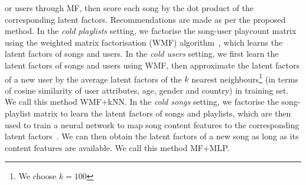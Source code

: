 \begin{itemize}
      or users through MF, then score each song by the dot product of the corresponding latent factors.
      Recommendations are made as per the proposed method.
      In the \emph{cold playlists} setting, we factorise the song-user playcount matrix using the 
      weighted matrix factorisation (WMF) algorithm~\cite{hu2008collaborative}, which learns the 
      latent factors of songs and users.
      In the \emph{cold users} setting, we first learn the latent factors of songs and users using WMF,
      then approximate the latent factors of a new user by the average latent factors of the $k$
      nearest neighbours\footnote{We choose $k=100$}
      (in terms of cosine similarity of user attributes, \eg age, gender and country) in training set.
      We call this method WMF+kNN.
      In the \emph{cold songs} setting, we factorise the song-playlist matrix to learn the latent factors of 
      songs and playlists, which are then used to train a neural network to map song content features 
      to the corresponding latent factors~\cite{Gantner:2010,van2013deep}.
	  We can then obtain the latent factors of a new song as long as its content features are available.
      We call this method MF+MLP. 
%
\end{itemize}


